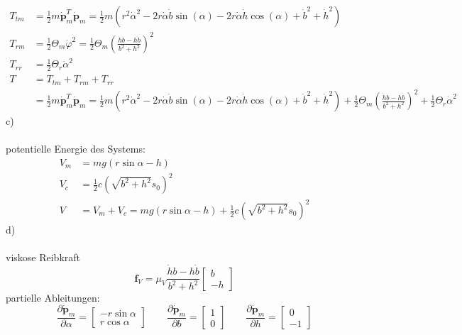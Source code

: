 \begin{align*}
	T_{tm} &= \frac{1}{2}m\dot{\textbf{p}}_m^T \dot{\textbf{p}}_m = \frac{1}{2} m \left( r^2\dot{\alpha}^2 -2r\dot{\alpha}\dot{b}\sin\left(\alpha\right) - 2r\dot{\alpha}\dot{h}\cos\left(\alpha\right) + \dot{b}^2 + \dot{h}^2\right) \\
	T_{rm} &= \frac{1}{2} \Theta_m\dot{\varphi}^2 = \frac{1}{2} \Theta_m \left( \frac{\dot{h}b - h\dot{b}}{b^2 + h^2}\right)^2 \\
	T_{rr} &= \frac{1}{2}\Theta_r\dot{\alpha}^2 \\
	T &= T_{tm} + T_{rm} + T_{rr} \\
	  &= \frac{1}{2}m\dot{\textbf{p}}_m^T \dot{\textbf{p}}_m = \frac{1}{2} m \left( r^2\dot{\alpha}^2 -2r\dot{\alpha}\dot{b}\sin\left(\alpha\right) - 2r\dot{\alpha}\dot{h}\cos\left(\alpha\right) + \dot{b}^2 + \dot{h}^2\right) 
	  + \frac{1}{2} \Theta_m \left( \frac{\dot{h}b - h\dot{b}}{b^2 + h^2}\right)^2 + \frac{1}{2}\Theta_r\dot{\alpha}^2
\end{align*}
c) \\ \\
potentielle Energie des Systems:
\begin{align*}
	V_m &= mg\left(r\sin\alpha - h\right) \\
	V_c &= \frac{1}{2} c \left(\sqrt{b^2 + h^2} s_0\right)^2 \\
	V &= V_m + V_c = mg\left(r\sin\alpha - h\right) + \frac{1}{2} c \left(\sqrt{b^2 + h^2} s_0\right)^2
\end{align*}
d) \\ \\
viskose Reibkraft
\[
	\textbf{f}_V = \mu_V \frac{\dot{h}b - h\dot{b}}{b^2 + h^2} \left[ \begin{matrix}
	b \\ -h
	\end{matrix}\right]
\]
partielle Ableitungen:
\[
	\frac{\partial \dot{\textbf{p}}_m}{\partial \alpha}  = \left[ \begin{matrix}
		-r\sin\alpha \\ r\cos\alpha
	\end{matrix}\right] \qquad \frac{\partial \dot{\textbf{p}}_m}{\partial b} = \left[ \begin{matrix}
	 1 \\ 0
	\end{matrix}\right] \qquad \frac{\partial \dot{\textbf{p}}_m}{\partial h} = \left[ \begin{matrix}
	0 \\ -1
	\end{matrix}\right]
\]
